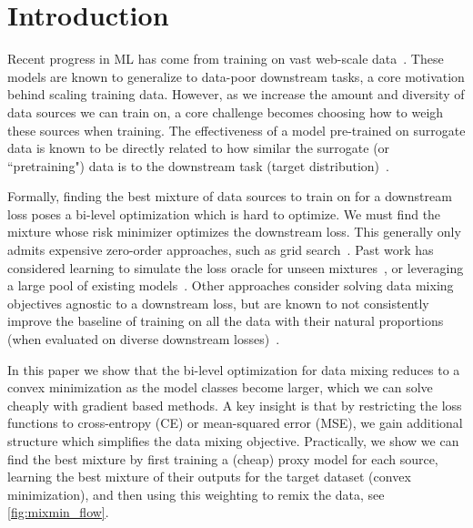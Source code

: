 \section{Introduction}









Recent progress in ML has come from training on vast web-scale data~\citep{dubey2024llama,touvron2023llama,raffel2020exploring,achiam2023gpt}. These models are known to generalize to data-poor downstream tasks, a core motivation behind scaling training data. However, as we increase the amount and diversity of data sources we can train on, a core challenge becomes choosing how to weigh these sources when training. The effectiveness of a model pre-trained on surrogate data is known to be directly related to how similar the surrogate (or ``pretraining") data is to the downstream task (target distribution)~\citep{ben2010theory,isik2024scaling,jain2024scaling, pouget2024no}. 





Formally, finding the best mixture of data sources to train on for a downstream loss poses a bi-level optimization which is hard to optimize. We must find the mixture whose risk minimizer optimizes the downstream loss. This generally only admits expensive zero-order approaches, such as grid search~\citep{dubey2024llama,blakeney2024does}. Past work has considered learning to simulate the loss oracle for unseen mixtures~\citep{liu2024regmix}, or leveraging a large pool of existing models~\citep{thrush2024improving}. Other approaches consider solving data mixing objectives agnostic to a downstream loss, but are known to not consistently improve the baseline of training on all the data with their natural proportions (when evaluated on diverse downstream losses)~\citep{xie2024doremi,jiang2024adaptive, liu2024regmix, fan2023doge, held2025optimizing}. 



In this paper we show that the bi-level optimization for data mixing reduces to a convex minimization as the model classes become larger, which we can solve cheaply with gradient based methods. A key insight is that by restricting the loss functions to cross-entropy (CE) or mean-squared error (MSE), we gain additional structure which simplifies the data mixing objective. Practically, we show we can find the best mixture by first training a (cheap) proxy model for each source, learning the best mixture of their outputs for the target dataset (convex minimization), and then using this weighting to remix the data, see \cref{fig:mixmin_flow}.







